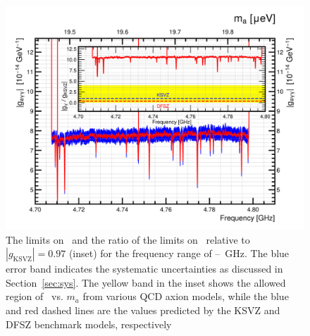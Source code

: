 \begin{figure} [htbp]
  \centering
  \includegraphics[width=12.9cm]{figures/TASEHonly_limits.png}
  \caption{The limits on \gagg\ and the ratio of the limits on 
\ggamma\ relative to $\left|g_\text{KSVZ}\right|=0.97$ 
  (inset) for the frequency range of 
\flo--\fhi~GHz. The blue error band indicates the systematic 
  uncertainties as discussed in Section~\ref{sec:sys}. The yellow 
 band in the inset shows the allowed region of \ggamma\ vs. $m_a$ 
 from various QCD axion models, while the blue and red dashed lines are the 
values predicted by the KSVZ and DFSZ benchmark models, respectively}
  \label{fig:glimit}
\end{figure}


